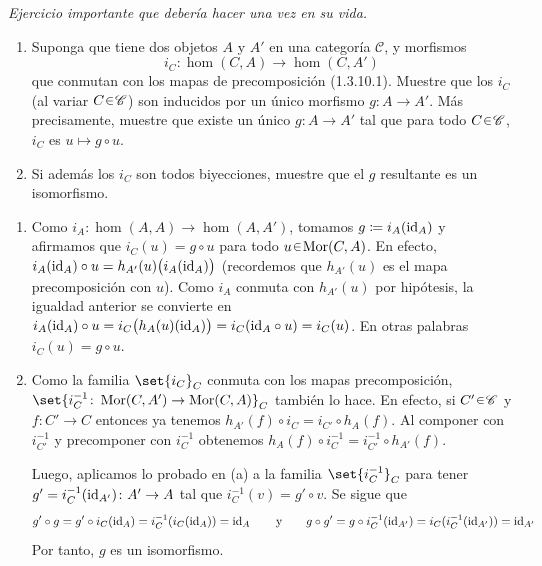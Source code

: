 \setcounter{neje}{25}
\begin{nejer}
\emph{Ejercicio importante que debería hacer una vez en su vida.} 
\begin{enumerate}[label=(\alph*)]
\item Suponga que tiene dos objetos $A$ y $A'$ en una categoría $\mathscr{C}$, y morfismos
$$i_C \colon \hom(C,A) \to \hom(C,A') $$
que conmutan con los mapas de precomposición (1.3.10.1). Muestre que los $i_C$ (al variar $C\en\mathscr{C}$) son inducidos por un único morfismo $g \colon A \to A'$. Más precisamente, muestre que existe un único $g \colon A \to A'$ tal que para todo $C \en \mathscr{C}$, $i_C$ es $u \mapsto g \circ u$.
\item Si además los $i_C$ son todos biyecciones, muestre que el $g$ resultante es un isomorfismo.
\end{enumerate}
\end{nejer}
\begin{sol}\hphantom{t}
\begin{enumerate}[label=(\alph*)]
\item 
Como $i_A \colon \hom(A,A) \to \hom(A,A')$, tomamos $g \coloneq i_A(\operatorname{id}_A)$ y afirmamos que $i_C(u) = g \circ u$ para todo $u\en \hom(C,A)$. En efecto, $i_A(\operatorname{id}_A) \circ u = h_{A'}(u)\bigl(i_A(\operatorname{id}_A)\bigr)$ (recordemos que $h_{A'}(u)$ es el mapa precomposición con $u$). Como $i_A$ conmuta con $h_{A'}(u)$ por hipótesis, la igualdad anterior se convierte en $i_A(\operatorname{id}_A) \circ u = i_C\bigl(h_A(u)(\operatorname{id}_A)\bigr) = i_C({\operatorname{id}_A} \circ u) = i_C(u)$. En otras palabras $i_C(u) = g \circ u$.

\item 
Como la familia $\set{i_C}_C$ conmuta con los mapas precomposición, $\set{i^{-1}_C \colon \hom(C,A') \to \hom(C,A)}_C$ también lo hace. En efecto, si $C'\en \mathscr{C}$ y $f\colon C' \to C$ entonces ya tenemos $h_{A'}(f)\circ i_C = i_{C'} \circ h_A(f)$. Al componer con $i^{-1}_{C'}$ y precomponer con $i^{-1}_C$ obtenemos $h_A(f) \circ i^{-1}_C = i^{-1}_{C'} \circ h_{A'}(f)$.\par
Luego, aplicamos lo probado en (a) a la familia $\set{i^{-1}_C}_C$ para tener $g' = i^{-1}_C(\operatorname{id}_{A'})\colon A' \to A$ tal que $i^{-1}_C(v) = g' \circ v$. Se sigue que
\[
g' \circ g 
= g' \circ i_C(\operatorname{id}_A) 
= i^{-1}_C(i_C(\operatorname{id}_A)) 
= \operatorname{id}_A
\qquad\text{y}\qquad
g \circ g'
= g \circ i^{-1}_C(\operatorname{id}_{A'}) 
= i_C(i^{-1}_C(\operatorname{id}_{A'})) 
= \operatorname{id}_{A'}
\]
Por tanto, $g$ es un isomorfismo.
\end{enumerate}
\end{sol}